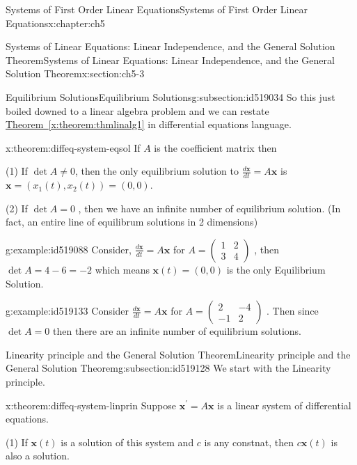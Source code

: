 \documentclass[oneside,10pt,]{book}
\newcommand{\xreffont}{\relax}
\numberwithin{equation}{section}
\numberwithin{equation}{section}
\newcommand{\amp}{&}
\begin{document}
\begin{chapterptx}{Systems of First Order Linear Equations}{}{Systems of First Order Linear Equations}{}{}{x:chapter:ch5}
\begin{sectionptx}{Systems of Linear Equations: Linear Independence, and the General Solution Theorem}{}{Systems of Linear Equations: Linear Independence, and the General Solution Theorem}{}{}{x:section:ch5-3}
\begin{subsectionptx}{Equilibrium Solutions}{}{Equilibrium Solutions}{}{}{g:subsection:id519034}
So this just boiled downed to a linear algebra problem and we can restate \hyperref[x:theorem:thmlinalg1]{Theorem~{\xreffont\ref{x:theorem:thmlinalg1}}} in differential equations language.%
\begin{theorem}{}{}{x:theorem:diffeq-system-eqsol}%
If \(A\) is the coefficient matrix then%
\par
(1) If \(\det A\neq0\), then the only equilibrium solution to \(\frac{d\mathbf{x}}{dt}=A\mathbf{x}\) is \(\mathbf{x}=(x_{1}(t),x_{2}(t))=\left(0,0\right)\).%
\par
(2) If \(\det A=0\) , then we have an infinite number of equilibrium solution. (In fact, an entire line of equilibrum solutions in 2 dimensions)%
\end{theorem}
\begin{example}{}{g:example:id519088}%
Consider, \(\frac{d\mathbf{x}}{dt}=A\mathbf{x}\) for \(A=\left(\begin{array}{cc}
1 \amp 2\\
3 \amp 4
\end{array}\right)\) , then \(\det A=4-6=-2\) which means \(\mathbf{x}(t)=\left(0,0\right)\) is the only Equilibrium Solution.%
\end{example}
\begin{example}{}{g:example:id519133}%
Consider \(\frac{d\mathbf{x}}{dt}=A\mathbf{x}\) for \(A=\left(\begin{array}{cc}
2 \amp -4\\
-1 \amp 2
\end{array}\right)\) . Then since \(\det A=0\) then there are an infinite number of equilibrium solutions.%
\end{example}
\end{subsectionptx}
%
%
\typeout{************************************************}
\typeout{************************************************}
%
\begin{subsectionptx}{Linearity principle and the General Solution Theorem}{}{Linearity principle and the General Solution Theorem}{}{}{g:subsection:id519128}
We start with the Linearity principle.%
\begin{theorem}{}{}{x:theorem:diffeq-system-linprin}%
Suppose \(\mathbf{x}^{\prime}=A\mathbf{x}\) is a linear system of differential equations.%
\par
(1) If \(\mathbf{x}(t)\) is a solution of this system and \(c\) is any constnat, then \(c\mathbf{x}(t)\) is also a solution.%
\par

\end{theorem}
\end{subsectionptx}
\end{sectionptx}
\end{chapterptx}
\end{document}
